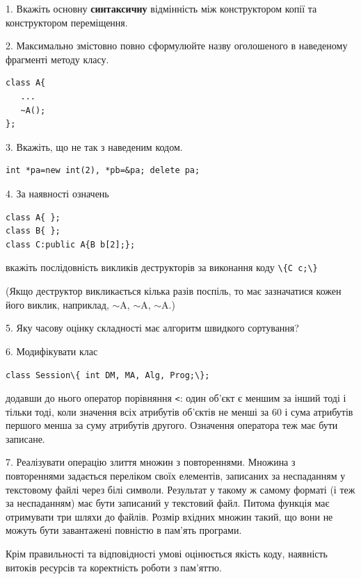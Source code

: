 \documentclass[12pt, ukrainian]{article}
\def\code#1{\Verb!#1!}
\begin{document}
{%
1. Вкажіть основну \textbf{синтаксичну} відмінність між конструктором копії та конструктором переміщення.%
\par
\vspace{2mm}
2. Максимально змістовно повно сформулюйте назву оголошеного в наведеному фрагменті методу класу.
\vspace{-3mm}
\begin{verbatim}class A{
   ...
   ~A();
};\end{verbatim}
\vspace{-3mm}
\par
\vspace{2mm}
3. Вкажіть, що не так з наведеним кодом.
\vspace{-3mm}
\begin{verbatim}int *pa=new int(2), *pb=&pa; delete pa;\end{verbatim}
\vspace{-3mm}
\par
\vspace{2mm}
4. За наявності означень
\vspace{-3mm}
\begin{verbatim}
class A{ };
class B{ };
class C:public A{B b[2];};\end{verbatim}
\vspace{-3mm}
вкажіть послідовність викликів деструкторів за виконання коду \code{\{C c;\}} 

(Якщо деструктор викликається кілька разів поспіль, то має зазначатися кожен його виклик, наприклад, $\sim$A, $\sim$A, $\sim$A.)

\vspace{2mm}
5. Яку часову оцінку складності має алгоритм швидкого сортування?
\par
\vspace{2mm}
6. Модифікувати клас 

\qquad\code{class Session\{ int DM, MA, Alg, Prog;\};} 


додавши до нього оператор порівняння \code{<}: один об'єкт є меншим за інший тоді і тільки тоді, коли значення всіх атрибутів об'єктів не менші за 60 і сума атрибутів першого менша за суму атрибутів другого. Означення оператора теж має бути записане.%
\par
\vspace{2mm}
7. 
Реалізувати операцію злиття множин з повтореннями. Множина з повтореннями задається переліком своїх елементів, записаних за неспаданням у текстовому файлі через білі символи. Результат у такому ж самому форматі (і теж за неспаданням) має бути записаний у текстовий файл. Питома функція має отримувати три шляхи до файлів. Розмір вхідних множин такий, що вони не можуть бути завантажені повністю в пам’ять програми.

Крім правильності та відповідності умові оцінюється якість коду, наявність витоків ресурсів та коректність роботи з пам'яттю. 

}
\end{document}
